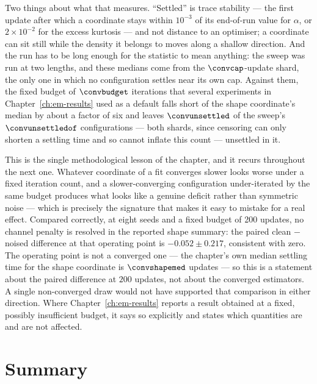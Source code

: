 Two things about what that measures. ``Settled'' is trace stability --- the
first update after which a coordinate stays within $10^{-3}$ of its end-of-run
value for $\alpha$, or $2\times10^{-2}$ for the excess kurtosis --- and not
distance to an optimiser; a coordinate can sit still while the density it
belongs to moves along a shallow direction. And the run has to be long enough
for the statistic to mean anything: the sweep was run at two lengths, and these
medians come from the $\convcap$-update shard, the only one in which no
configuration settles near its own cap. Against them, the fixed budget of
$\convbudget$ iterations that several experiments in
Chapter~\ref{ch:em-results} used as a default
falls short of the shape coordinate's median by about a factor of six and
leaves $\convunsettled$ of the sweep's $\convunsettledof$ configurations ---
both shards, since censoring can only shorten a settling time and so cannot
inflate this count --- unsettled in it.

\begin{remark}
\label{rmk:em-fixed-budget}
This is the single methodological lesson of the chapter, and it recurs
throughout the next one. Whatever coordinate of a fit converges slower looks
worse under a fixed iteration count, and a slower-converging configuration
under-iterated by the same budget produces what looks like a genuine deficit
rather than symmetric noise --- which is precisely the signature that makes it
easy to mistake for a real effect. Compared correctly, at eight seeds and a
fixed budget of 200 updates, no channel penalty is resolved in the reported
shape summary: the paired clean $-$ noised difference at that operating point
is $-0.052\pm0.217$, consistent with zero. The operating point is not a
converged one --- the chapter's own median settling time for the shape
coordinate is $\convshapemed$ updates --- so this is a statement about the
paired difference at $200$ updates, not about the converged estimators. A single non-converged draw would
not have supported that comparison in either direction. Where Chapter~\ref{ch:em-results}
reports a result obtained at a fixed, possibly insufficient budget, it says so
explicitly and states which quantities are and are not affected.
\end{remark}

\section{Summary}

